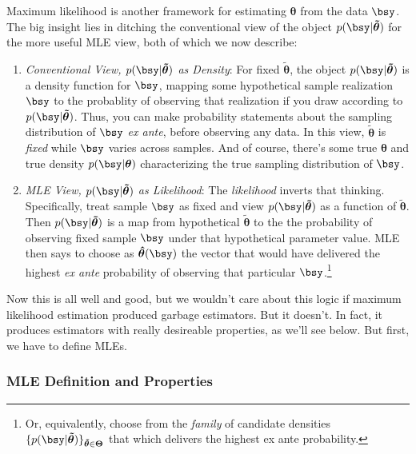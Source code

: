 \documentclass[12pt]{article}
\theoremstyle{plain}
\theoremstyle{definition}
\theoremstyle{remark}
\newcommand{\bstheta}{\boldsymbol{\theta}}
\newcommand{\bsTheta}{\boldsymbol{\Theta}}
\newcommand{\bshattheta}{\boldsymbol{\hat{\theta}}}
\newcommand{\bstildetheta}{\boldsymbol{\tilde{\theta}}}
\begin{document}
Maximum likelihood is another framework for estimating $\bstheta$ from
the data $\bsy$.
The big insight lies in ditching the conventional view of the object
$p(\bsy|\bstildetheta)$ for the more useful MLE view, both of which we
now describe:
\begin{enumerate}[label=(\roman*)]
  \item
    \emph{Conventional View, $p(\bsy|\bstildetheta)$ as Density}:
    For fixed $\bstildetheta$, the object $p(\bsy|\bstildetheta)$ is a
    density function for $\bsy$, mapping some hypothetical sample
    realization $\bsy$ to the probablity of observing that realization
    if you draw according to $p(\bsy|\bstildetheta)$.
    Thus, you can make probability statements about the sampling
    distribution of $\bsy$ \emph{ex ante}, before observing any data.
    In this view, $\bstildetheta$ is \emph{fixed} while $\bsy$ varies
    across samples.
    And of course, there's some true $\bstheta$ and true density
    $p(\bsy|\bstheta)$ characterizing the true sampling distribution of
    $\bsy$.

  \item
    \emph{MLE View, $p(\bsy|\bstildetheta)$ as Likelihood}:
    The \emph{likelihood} inverts that thinking.
    Specifically, treat sample $\bsy$ as fixed and view
    $p(\bsy|\bstildetheta)$ as a function of $\bstildetheta$.
    Then $p(\bsy|\bstildetheta)$ is a map from hypothetical
    $\bstildetheta$ to the the probability of observing fixed sample
    $\bsy$ under that hypothetical parameter value.
    MLE then says to choose as $\bshattheta(\bsy)$ the vector that would
    have delivered the highest \emph{ex ante} probability of observing
    that particular $\bsy$.\footnote{%
      Or, equivalently, choose from the \emph{family} of candidate
      densities $\{p(\bsy|\bstildetheta)\}_{\bstildetheta\in\bsTheta}$
      that which delivers the highest ex ante probability.
    }
\end{enumerate}
Now this is all well and good, but we wouldn't care about this logic if
maximum likelihood estimation produced garbage estimators. But it
doesn't. In fact, it produces estimators with really desireable
properties, as we'll see below. But first, we have to define MLEs.


\subsubsection{MLE Definition and Properties}
\end{document}
